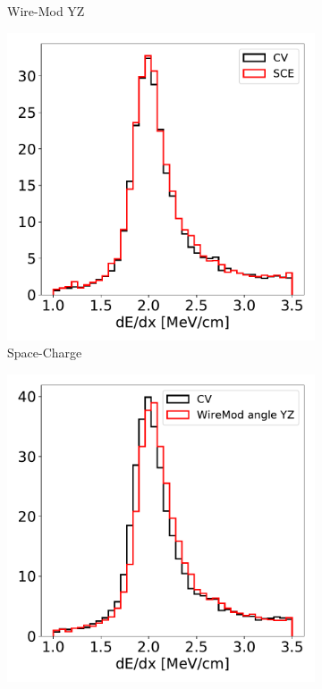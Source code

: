 \documentclass[a4paper]{article}
\begin{document}
\begin{figure}[H]
\begin{center}
\begin{subfigure}[b]{0.19\textwidth}
    \caption{\label{fig:detsys:dedx:WMYZ}Wire-Mod YZ}
    \end{subfigure}
    \begin{subfigure}[b]{0.19\textwidth}
    \centering
    \includegraphics[width=1.00\textwidth]{detsys/dedx/shr_tkfit_dedx_max_03232020_SCE.pdf}
    \caption{\label{fig:detsys:dedx:SCE}Space-Charge}
    \end{subfigure}
    \begin{subfigure}[b]{0.19\textwidth}
    \centering
    \includegraphics[width=1.00\textwidth]{detsys/dedx/shr_tkfit_dedx_max_03232020_WireMod_angle_YZ.pdf}

\end{subfigure}
\end{center}
\end{figure}
\end{document}
